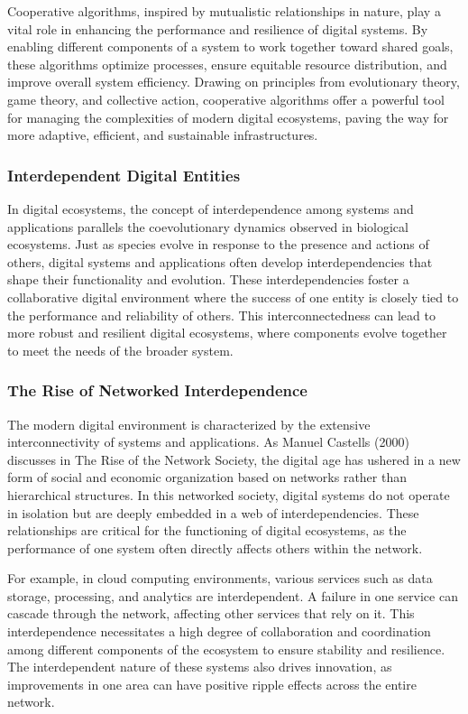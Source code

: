\documentclass[12pt,twoside]{article}
\begin{document}
Cooperative algorithms, inspired by mutualistic relationships in nature, play a vital role in enhancing the performance and resilience of digital systems. By enabling different components of a system to work together toward shared goals, these algorithms optimize processes, ensure equitable resource distribution, and improve overall system efficiency. Drawing on principles from evolutionary theory, game theory, and collective action, cooperative algorithms offer a powerful tool for managing the complexities of modern digital ecosystems, paving the way for more adaptive, efficient, and sustainable infrastructures.

\subsubsection{Interdependent Digital Entities}

In digital ecosystems, the concept of interdependence among systems and applications parallels the coevolutionary dynamics observed in biological ecosystems. Just as species evolve in response to the presence and actions of others, digital systems and applications often develop interdependencies that shape their functionality and evolution. These interdependencies foster a collaborative digital environment where the success of one entity is closely tied to the performance and reliability of others. This interconnectedness can lead to more robust and resilient digital ecosystems, where components evolve together to meet the needs of the broader system.

\subsubsection{The Rise of Networked Interdependence}

The modern digital environment is characterized by the extensive interconnectivity of systems and applications. As Manuel Castells (2000) discusses in The Rise of the Network Society, the digital age has ushered in a new form of social and economic organization based on networks rather than hierarchical structures. In this networked society, digital systems do not operate in isolation but are deeply embedded in a web of interdependencies. These relationships are critical for the functioning of digital ecosystems, as the performance of one system often directly affects others within the network.

For example, in cloud computing environments, various services such as data storage, processing, and analytics are interdependent. A failure in one service can cascade through the network, affecting other services that rely on it. This interdependence necessitates a high degree of collaboration and coordination among different components of the ecosystem to ensure stability and resilience. The interdependent nature of these systems also drives innovation, as improvements in one area can have positive ripple effects across the entire network.
\end{document}
